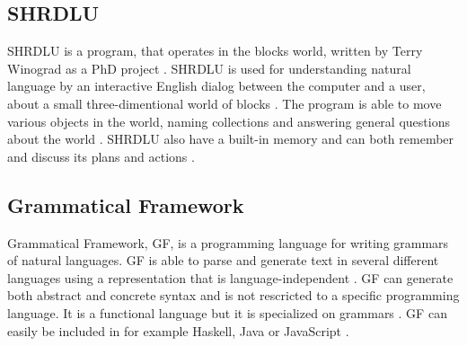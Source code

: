 \subsection{SHRDLU}
SHRDLU is a program, that operates in the blocks world, written by Terry Winograd as a PhD project \citep{SHRDLU_url}. SHRDLU is used for understanding natural language by an interactive English dialog between the computer and a user, about a small three-dimentional world of blocks \citep{SHRDLU_url}. The program is able to move various objects in the world, naming collections and answering general questions about the world \citep{SHRDLU_url2}. SHRDLU also have a built-in memory and can both remember and discuss its plans and actions \citep{SHRDLU_url2}.

\subsection{Grammatical Framework}
Grammatical Framework, GF, is a programming language for writing grammars of natural languages. GF is able to parse and generate text in several different languages using a representation that is language-independent \citep{gf_url}. GF can generate both abstract and concrete syntax and is not rescricted to a specific programming language. It is a functional language but it is specialized on grammars \citep{gf_url}. 
GF can easily be included in for example Haskell, Java or JavaScript \citep{gf_url}.

